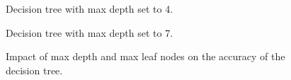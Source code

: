 \begin{figure}
    \centering
    \caption{Decision tree with max depth set to 4.}
    \label{fig:tree_4}
\end{figure}

\begin{figure}
    \centering
    \caption{Decision tree with max depth set to 7.}
    \label{fig:tree_7}
\end{figure}

\begin{figure}
    \centering
	\caption{Impact of max depth and max leaf nodes on the accuracy of the
    decision tree.}
\end{figure}

